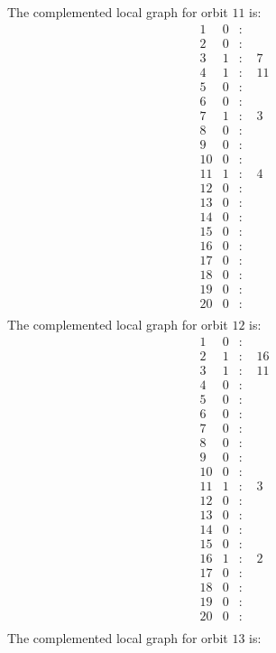 \documentclass[12pt]{article}
\begin{document}
The complemented local graph for orbit $11$ is:
\begin{equation*}
\begin{array}{rrcl}
1&0&:&\\
2&0&:&\\
3&1&:&\,\,7\\
4&1&:&\,\,11\\
5&0&:&\\
6&0&:&\\
7&1&:&\,\,3\\
8&0&:&\\
9&0&:&\\
10&0&:&\\
11&1&:&\,\,4\\
12&0&:&\\
13&0&:&\\
14&0&:&\\
15&0&:&\\
16&0&:&\\
17&0&:&\\
18&0&:&\\
19&0&:&\\
20&0&:&\\
\end{array}
\end{equation*}
The complemented local graph for orbit $12$ is:
\begin{equation*}
\begin{array}{rrcl}
1&0&:&\\
2&1&:&\,\,16\\
3&1&:&\,\,11\\
4&0&:&\\
5&0&:&\\
6&0&:&\\
7&0&:&\\
8&0&:&\\
9&0&:&\\
10&0&:&\\
11&1&:&\,\,3\\
12&0&:&\\
13&0&:&\\
14&0&:&\\
15&0&:&\\
16&1&:&\,\,2\\
17&0&:&\\
18&0&:&\\
19&0&:&\\
20&0&:&\\
\end{array}
\end{equation*}
The complemented local graph for orbit $13$ is:
\end{document}
